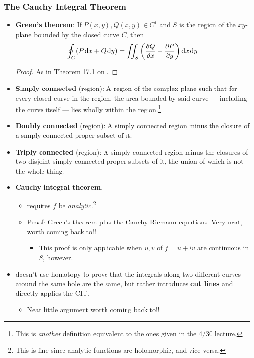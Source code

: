 \documentclass[../finalProject.tex]{subfiles}
\begin{document}
\subsubsection{The Cauchy Integral Theorem}
\begin{itemize}
    \item \textbf{Green's theorem}: If $P(x,y),Q(x,y)\in C^1$ and $S$ is the region of the $xy$-plane bounded by the closed curve $C$, then
    \begin{equation*}
        \oint_C(P\dd{x}+Q\dd{y}) = \iint_S\left( \pdv{Q}{x}-\pdv{P}{y} \right)\dd{x}\dd{y}
    \end{equation*}
    \begin{proof}
        As in Theorem 17.1 on \textcite[89-90]{bib:CAAGThomasNotes}.
    \end{proof}
    \item \textbf{Simply connected} (region): A region of the complex plane such that for every closed curve in the region, the area bounded by said curve --- including the curve itself --- lies wholly within the region.\footnote{This is \emph{another} definition equivalent to the ones given in the 4/30 lecture.}
    \item \textbf{Doubly connected} (region): A simply connected region minus the closure of a simply connected proper subset of it.
    \item \textbf{Triply connected} (region): A simply connected region minus the closures of two disjoint simply connected proper subsets of it, the union of which is not the whole thing.
    \item \textbf{Cauchy integral theorem}.
    \begin{itemize}
        \item \textcite{bib:Seaborn} requires $f$ be \emph{analytic}.\footnote{This is fine since analytic functions are holomorphic, and vice versa.}
        \item Proof: Green's theorem plus the Cauchy-Riemann equations. Very neat, worth coming back to!!
        \begin{itemize}
            \item This proof is only applicable when $u,v$ of $f=u+iv$ are continuous in $\overline{S}$, however.
        \end{itemize}
    \end{itemize}
    \item \textcite[107-09]{bib:Seaborn} doesn't use homotopy to prove that the integrals along two different curves around the same hole are the same, but rather introduces \textbf{cut lines} and directly applies the CIT.
    \begin{itemize}
        \item Neat little argument worth coming back to!!
    \end{itemize}
\end{itemize}
\end{document}

